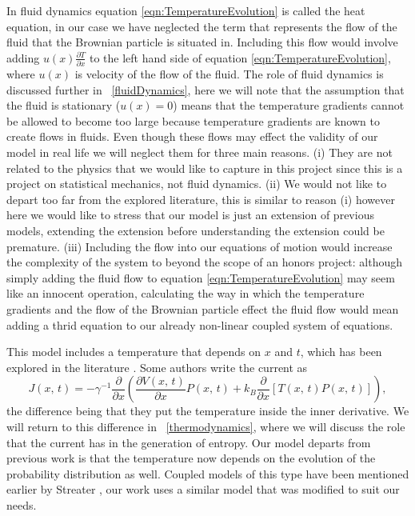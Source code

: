 In fluid dynamics equation \ref{eqn:TemperatureEvolution} is called the heat equation, in our case we have neglected the term that represents the flow of the fluid that the Brownian particle is situated in. Including this flow would involve adding $u(x) \frac{\partial T}{\partial x}$ to the left hand side of equation \ref{eqn:TemperatureEvolution}, where $u(x)$ is velocity of the flow of the fluid. The role of fluid dynamics is discussed further in ~\autoref{fluidDynamics}, here we will note that the assumption that the fluid is stationary ($u(x) = 0$) means that the temperature gradients cannot be allowed to become too large because temperature gradients are known to create flows in fluids. Even though these flows may effect the validity of our model in real life we will neglect them for three main reasons. (i) They are not related to the physics that we would like to capture in this project since this is a project on statistical mechanics, not fluid dynamics. (ii) We would not like to depart too far from the explored literature, this is similar to reason (i) however here we would like to stress that our model is just an extension of previous models, extending the extension before understanding the extension could be premature. (iii) Including the flow into our equations of motion would increase the complexity of the system to beyond the scope of an honors project: although simply adding the fluid flow to equation \ref{eqn:TemperatureEvolution} may seem like an innocent operation, calculating the way in which the temperature gradients and the flow of the Brownian particle effect the fluid flow would mean adding a thrid equation to our already non-linear coupled system of equations.

This model includes a temperature that depends on $x$ and $t$, which has been explored in the literature \cite{Kramers1940}. Some authors write the current as \cite{Kramers1940,Kampen1988}
\begin{equation}
J(x, \, t) = -\gamma^{-1} \frac{\partial}{\partial x} \left (\frac{\partial V(x, \, t)}{\partial x} P(x, \, t) + k_B \frac{\partial}{\partial x}[T(x, \, t) P(x, \, t)] \right ),  \label{eqn:diffCurrent}
\end{equation}
the difference being that they put the temperature inside the inner derivative. We will return to this difference in ~\autoref{thermodynamics}, where we will discuss the role that the current has in the generation of entropy.
Our model departs from previous work is that the temperature now depends on the evolution of the probability distribution as well. Coupled models of this type have been mentioned earlier by Streater \cite{Streater1997, Streater1997a,Streater2000,Streater1997b}, our work uses a similar model that was modified to suit our needs.

